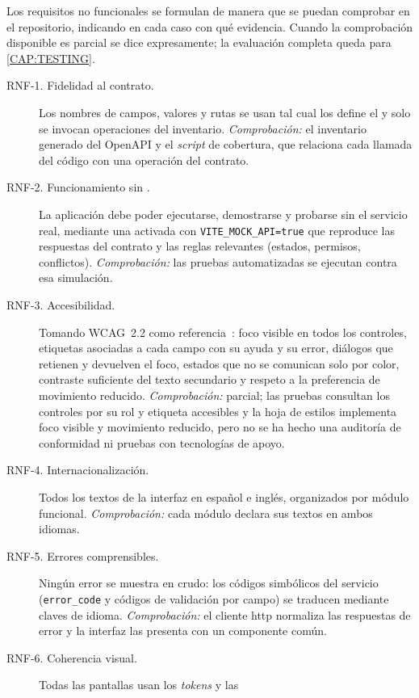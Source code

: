 Los requisitos no funcionales se formulan de manera que se puedan comprobar en el
repositorio, indicando en cada caso con qué evidencia. Cuando la comprobación disponible es
parcial se dice expresamente; la evaluación completa queda para \cref{CAP:TESTING}.

\begin{description}
  \item[RNF-1. Fidelidad al contrato.] Los nombres de campos, valores y rutas se usan tal cual
        los define el  y solo se invocan operaciones del inventario.
        \emph{Comprobación:} el inventario generado del OpenAPI y el \textit{script} de
        cobertura, que relaciona cada llamada del código con una operación del contrato.
  \item[RNF-2. Funcionamiento sin .] La aplicación debe poder ejecutarse,
        demostrarse y probarse sin el servicio real, mediante una  activada con
        \texttt{VITE\_MOCK\_API=true} que reproduce las respuestas del contrato y las reglas
        relevantes (estados, permisos, conflictos). \emph{Comprobación:} las pruebas
        automatizadas se ejecutan contra esa simulación.
  \item[RNF-3. Accesibilidad.] Tomando WCAG~2.2 como referencia~\cite{wcag22}: foco visible
        en todos los controles, etiquetas asociadas a cada campo con su ayuda y su error,
        diálogos que retienen y devuelven el foco, estados que no se comunican solo por color,
        contraste suficiente del texto secundario y respeto a la preferencia de movimiento
        reducido. \emph{Comprobación:} parcial; las pruebas consultan los controles por su rol
        y etiqueta accesibles y la hoja de estilos implementa foco visible y movimiento
        reducido, pero no se ha hecho una auditoría de conformidad ni pruebas con tecnologías
        de apoyo.
  \item[RNF-4. Internacionalización.] Todos los textos de la interfaz en español e inglés,
        organizados por módulo funcional. \emph{Comprobación:} cada módulo declara sus textos
        en ambos idiomas.
  \item[RNF-5. Errores comprensibles.] Ningún error se muestra en crudo: los códigos
        simbólicos del servicio (\texttt{error\_code} y códigos de validación por campo) se
        traducen mediante claves de idioma. \emph{Comprobación:} el cliente \acs{http}
        normaliza las respuestas de error y la interfaz las presenta con un componente común.
  \item[RNF-6. Coherencia visual.] Todas las pantallas usan los \textit{tokens} y las

\end{description}
